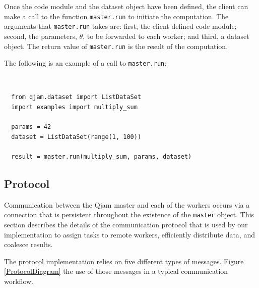 \documentclass[%
  final,
  notitlepage,
  narroweqnarray,
  inline,
]{ieee}
\begin{document}
Once the code module and the dataset object have been defined, the client can
make a call to the function \texttt{master.run} to initiate the computation. The
arguments that \texttt{master.run} takes are: first, the client defined code
module; second, the parameters, $\theta$, to be forwarded to each worker; and
third, a dataset object. The return value of \texttt{master.run} is the result
of the computation.

The following is an example of a call to \texttt{master.run}:

{\tt \small
\begin{verbatim}
  from qjam.dataset import ListDataSet
  import examples import multiply_sum

  params = 42
  dataset = ListDataSet(range(1, 100))

  result = master.run(multiply_sum, params, dataset)
\end{verbatim}}


\subsection{Protocol}
\label{Protocol}

Communication between the Qjam master and each of the workers occurs via
a connection that is persistent throughout the existence of the \texttt{master}
object. This section describes the details of the communication protocol that
is used by our implementation to assign tasks to remote workers, efficiently
distribute data, and coalesce results.

The protocol implementation relies on five different types of messages.
Figure \ref{ProtocolDiagram} the use of those messages in a typical
communication workflow.
\end{document}
